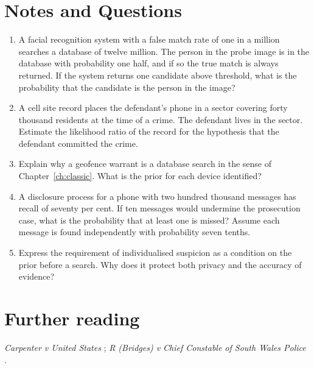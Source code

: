 \section*{Notes and Questions}
\begin{enumerate}[label=\arabic*.]
\item A facial recognition system with a false match rate of one in a million searches a database of twelve million. The person in the probe image is in the database with probability one half, and if so the true match is always returned. If the system returns one candidate above threshold, what is the probability that the candidate is the person in the image?
\item A cell site record places the defendant's phone in a sector covering forty thousand residents at the time of a crime. The defendant lives in the sector. Estimate the likelihood ratio of the record for the hypothesis that the defendant committed the crime.
\item Explain why a geofence warrant is a database search in the sense of Chapter~\ref{ch:classic}. What is the prior for each device identified?
\item A disclosure process for a phone with two hundred thousand messages has recall of seventy per cent. If ten messages would undermine the prosecution case, what is the probability that at least one is missed? Assume each message is found independently with probability seven tenths.
\item Express the requirement of individualised suspicion as a condition on the prior before a search. Why does it protect both privacy and the accuracy of evidence?
\end{enumerate}

\section*{Further reading}
\emph{Carpenter v United States} \citep{carpenter2018}; \emph{R (Bridges) v Chief Constable of South Wales Police} \citep{bridges2020}.
